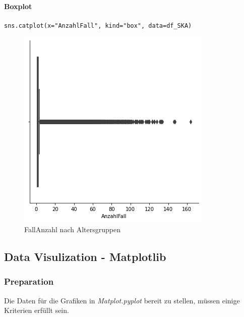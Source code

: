 \paragraph{Boxplot}
\begin{lstlisting}[style=python]
	sns.catplot(x="AnzahlFall", kind="box", data=df_SKA)
\end{lstlisting}
\begin{figure}[H]
	\centering
	\includegraphics[scale = 0.8]{attachment/chapter_3/Scc088}
	\caption{FallAnzahl nach Altersgruppen}
\end{figure} 




\subsection{Data Visulization - Matplotlib}
\subsubsection{Preparation}
Die Daten für die Grafiken in \textit{Matplot.pyplot} bereit zu stellen, müssen einige Kriterien erfüllt sein.
